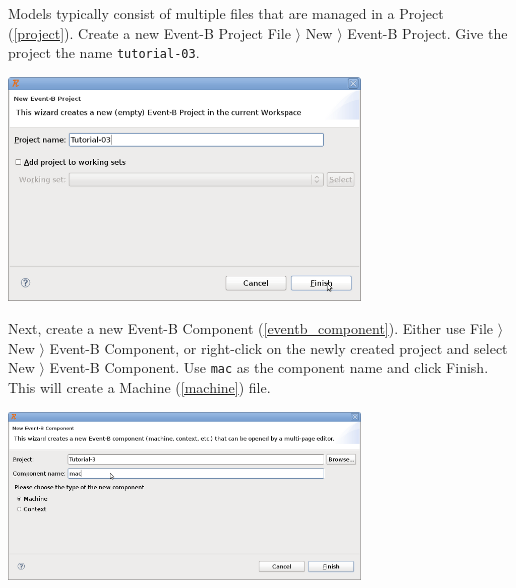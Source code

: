 Models typically consist of multiple files that are managed in a Project (\ref{project}).  Create a new Event-B Project \textsf{File $\rangle$ New $\rangle$ Event-B Project}.  Give the project the name \texttt{tutorial-03}.
\begin{center}
	\includegraphics[width=0.7\textwidth]{img/tutorial/tutorial-3.png}
\end{center}


Next, create a new Event-B Component (\ref{eventb_component}).  Either use \textsf{File $\rangle$ New $\rangle$ Event-B Component}, or right-click on the newly created project and select \textsf{New $\rangle$ Event-B Component}.  Use \texttt{mac} as the component name and click \textsf{Finish}.  This will create a Machine (\ref{machine}) file.

\begin{center}
	\includegraphics[width=0.7\textwidth]{img/tutorial/mac.png}
\end{center}

